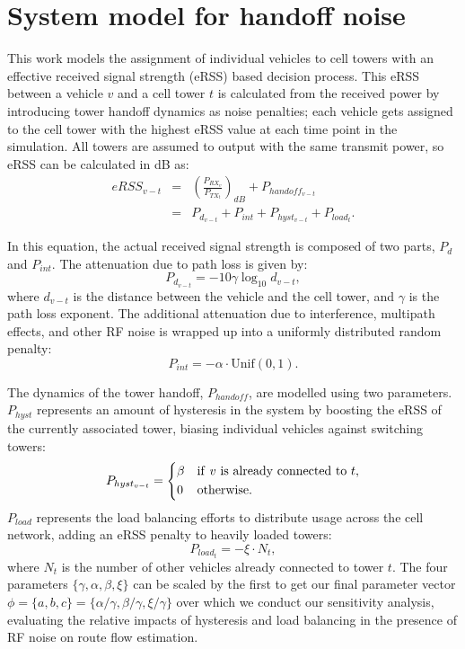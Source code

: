 
\section{System model for handoff noise}
\label{sec:system-model}
This work models the assignment of individual vehicles to cell towers with an effective received signal strength (eRSS) based decision process.  This eRSS between a vehicle $v$ and a cell tower $t$ is calculated from the received power by introducing tower handoff dynamics as noise penalties;
each vehicle gets assigned to the cell tower with the highest eRSS value at each time point in the simulation.
All towers are assumed to output with the same transmit power, so eRSS can be calculated in dB as: \begin{eqnarray}
  eRSS_{v-t} & = & \left( \frac{P_{RX_v}}{P_{TX_t}} \right)_{dB} 
                   + P_{handoff_{v-t}} \\
  & = & P_{d_{v-t}} +P_{int} + P_{hyst_{v-t}} + P_{load_t}.
\end{eqnarray}

In this equation, the actual received signal strength is composed of two parts, $P_d$ and $P_{int}$.  The attenuation due to path loss is given by: \begin{equation}
  P_{d_{v-t}} = -10 \gamma \log_{10} d_{v-t},
\end{equation}
where $d_{v-t}$ is the distance between the vehicle and the cell tower, and $\gamma$ is the path loss exponent.  The additional attenuation due to interference, multipath effects, and other RF noise is wrapped up into a uniformly distributed random penalty: \begin{equation}
  P_{int} = -\alpha \cdot \mathrm{Unif}(0,1).
\end{equation}

The dynamics of the tower handoff, $P_{handoff}$, are modelled using two parameters.  $P_{hyst}$ represents an amount of hysteresis in the system by boosting the eRSS of the currently associated tower, biasing individual vehicles against switching towers: \begin{equation}
  P_{hyst_{v-t}} = \begin{dcases}
    \beta & \mathrm{if~} v \mathrm{~is~already~connected~to~} t, \\
    0 & \mathrm{otherwise.}
  \end{dcases}
\end{equation}
$P_{load}$ represents the load balancing efforts to distribute usage across the cell network, adding an eRSS penalty to heavily loaded towers: \begin{equation}
  P_{load_t} = -\xi \cdot N_{t},
\end{equation}
where $N_t$ is the number of other vehicles already connected to tower $t$.  The four parameters $\{\gamma, \alpha, \beta, \xi\}$ can be scaled by the first to get our final parameter vector $\phi = \{a, b, c\} = \{\alpha/\gamma, \beta/\gamma, \xi/\gamma\}$ over which we conduct our sensitivity analysis, evaluating the relative impacts of hysteresis and load balancing in the presence of RF noise on route flow estimation.

